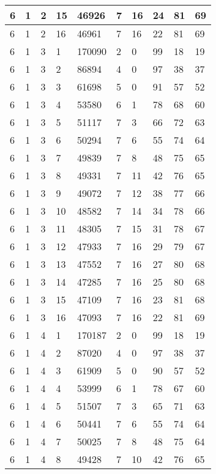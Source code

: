 \begin{table}[!ht]
\begin{tabular}{|l|l|l|l|l|l|l|l|l|l|}
        6 & 1 & 2 & 15 & 46926 & 7 & 16 & 24 & 81 & 69 \\ \hline
        6 & 1 & 2 & 16 & 46961 & 7 & 16 & 22 & 81 & 69 \\ \hline
        6 & 1 & 3 & 1 & 170090 & 2 & 0 & 99 & 18 & 19 \\ \hline
        6 & 1 & 3 & 2 & 86894 & 4 & 0 & 97 & 38 & 37 \\ \hline
        6 & 1 & 3 & 3 & 61698 & 5 & 0 & 91 & 57 & 52 \\ \hline
        6 & 1 & 3 & 4 & 53580 & 6 & 1 & 78 & 68 & 60 \\ \hline
        6 & 1 & 3 & 5 & 51117 & 7 & 3 & 66 & 72 & 63 \\ \hline
        6 & 1 & 3 & 6 & 50294 & 7 & 6 & 55 & 74 & 64 \\ \hline
        6 & 1 & 3 & 7 & 49839 & 7 & 8 & 48 & 75 & 65 \\ \hline
        6 & 1 & 3 & 8 & 49331 & 7 & 11 & 42 & 76 & 65 \\ \hline
        6 & 1 & 3 & 9 & 49072 & 7 & 12 & 38 & 77 & 66 \\ \hline
        6 & 1 & 3 & 10 & 48582 & 7 & 14 & 34 & 78 & 66 \\ \hline
        6 & 1 & 3 & 11 & 48305 & 7 & 15 & 31 & 78 & 67 \\ \hline
        6 & 1 & 3 & 12 & 47933 & 7 & 16 & 29 & 79 & 67 \\ \hline
        6 & 1 & 3 & 13 & 47552 & 7 & 16 & 27 & 80 & 68 \\ \hline
        6 & 1 & 3 & 14 & 47285 & 7 & 16 & 25 & 80 & 68 \\ \hline
        6 & 1 & 3 & 15 & 47109 & 7 & 16 & 23 & 81 & 68 \\ \hline
        6 & 1 & 3 & 16 & 47093 & 7 & 16 & 22 & 81 & 69 \\ \hline
        6 & 1 & 4 & 1 & 170187 & 2 & 0 & 99 & 18 & 19 \\ \hline
        6 & 1 & 4 & 2 & 87020 & 4 & 0 & 97 & 38 & 37 \\ \hline
        6 & 1 & 4 & 3 & 61909 & 5 & 0 & 90 & 57 & 52 \\ \hline
        6 & 1 & 4 & 4 & 53999 & 6 & 1 & 78 & 67 & 60 \\ \hline
        6 & 1 & 4 & 5 & 51507 & 7 & 3 & 65 & 71 & 63 \\ \hline
        6 & 1 & 4 & 6 & 50441 & 7 & 6 & 55 & 74 & 64 \\ \hline
        6 & 1 & 4 & 7 & 50025 & 7 & 8 & 48 & 75 & 64 \\ \hline
        6 & 1 & 4 & 8 & 49428 & 7 & 10 & 42 & 76 & 65 \\ \hline

\end{tabular}
\end{table}
